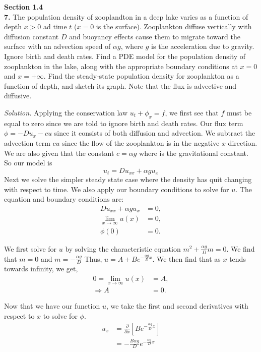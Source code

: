 \documentclass{article}
\begin{document}
\noindent
\textbf{Section 1.4}  
\\
\textbf{7.} The population density of zooplandton in a deep lake varies as a function of depth \(x>0\) ad time \(t\) (\(x=0\) is the surface). Zooplankton diffuse vertically with diffusion constant \(D\) and buoyancy effects cause them to migrate toward the surface with an advection speed of \(\alpha g\), where \(g\) is the acceleration due to gravity. Ignore birth and death rates. Find a PDE model for the population density of zooplankton in the lake, along with the appropriate boundary conditions at \(x=0\) and \(x=+\infty \). Find the steady-state population density for zooplankton as a function of depth, and sketch its graph. Note that the flux is advective and diffusive. 


\vspace{4mm}
\noindent
\textit{Solution.}  Applying the conservation law \( u_t + \phi_x = f \), we first see that \(f\) must be equal to zero since we are told to ignore birth and death rates.  Our flux term \( \phi = -Du_x - cu \) since it consists of both diffusion and advection.  We subtract the advection term \(cu\) since the flow of the zooplankton is in the negative \(x\) direction. We are also given that the constant \(c=\alpha g\) where is the gravitational constant. So our model is 
\[
u_t = Du_{xx} + \alpha gu_x 
\]
Next we solve the simpler steady state case where the density has quit changing with respect to time. We also apply our boundary conditions to solve for \(u\). The equation and boundary conditions are: 
\begin{align*}
Du_{xx}+ \alpha gu_x &= 0, \\
\lim_{x \rightarrow \infty} u(x) &= 0,\\
\phi(0) &= 0.
\end{align*}

\noindent
We first solve for \(u\) by solving the characteristic equation \( m^2 + \frac{ \alpha g}{D}m =0\). We find that \(m=0\) and \( m= -\frac{\alpha g}{D} \) Thus, \(u= A + Be^ {-\frac{\alpha g}{D}x}\). We then find that as \(x\) tends towards infinity, we get, 
\begin{align*}
0=\lim_{x \rightarrow \infty} u(x) &= A ,\\
\Rightarrow A&=0.
\end{align*}

\noindent 
Now that we have our function \(u\), we take the first and second derivatives with respect to 
\(x\) to solve for \(\phi\). 
\begin{align*}
  u_x &= \frac{\partial}{\partial x} \left[  Be^ {-\frac{\alpha g}{D}x} \right] \\ 
&=-\frac{B \alpha g}{D} e^ {-\frac{\alpha g}{D}x} \\  			
\end{align*}
\end{document}
